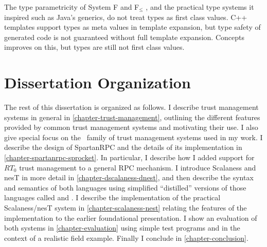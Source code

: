 The type parametricity of System F and F$_\le$ \cite{Cardelli-1985}, and the practical type
systems it inspired such as Java's generics, do not treat types as first class values. C++
templates support types as meta values in template expansion, but type safety of generated code
is not guaranteed without full template expansion. Concepts \cite{gregor06:_concepts} improves
on this, but types are still not first class values.

\section{Dissertation Organization}

The rest of this dissertation is organized as follows. I describe trust management systems in
general in \autoref{chapter-trust-management}, outlining the different features provided by
common trust management systems and motivating their use. I also give special focus on the \RT\
family of trust management systems used in my work. I describe the design of SpartanRPC and the
details of its implementation in \autoref{chapter-spartanrpc-sprocket}. In particular, I
describe how I added support for $RT_0$ trust management to a general RPC mechanism. I introduce
Scalaness and nesT in more detail in \autoref{chapter-dscalaness-dnest}, and then describe the
syntax and semantics of both languages using simplified ``distilled'' versions of those
languages called \newterm{DScalaness} and \newterm{DnesT}. I describe the implementation of the
practical Scalaness/nesT system in \autoref{chapter-scalaness-nest} relating the features of the
implementation to the earlier foundational presentation. I show an evaluation of both systems in
\autoref{chapter-evaluation} using simple test programs and in the context of a realistic field
example. Finally I conclude in \autoref{chapter-conclusion}.


